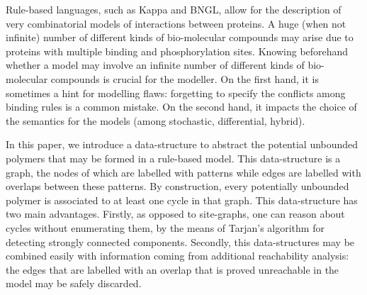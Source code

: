 Rule-based languages, such as Kappa and BNGL, allow for the description of very combinatorial models of interactions between proteins. A huge (when not infinite) number of different kinds of bio-molecular compounds may arise
 due to proteins with multiple binding and phosphorylation sites. Knowing beforehand whether a model may involve an infinite number of different kinds of bio-molecular compounds is crucial for the modeller. On the first hand, it is sometimes a hint for modelling flaws: forgetting to specify
the conflicts among binding rules is a common mistake. On the second hand,
it impacts the choice of  the semantics for the models (among stochastic, differential, hybrid).

In this paper, we introduce a data-structure to abstract the potential unbounded polymers that may be formed in a rule-based model. This data-structure is a graph, the nodes of which are labelled with patterns while edges are labelled with overlaps between these patterns. By construction,  every potentially unbounded polymer is associated to at least one cycle in that graph. This data-structure has two main advantages. Firstly, as opposed to site-graphs, one can reason about cycles without enumerating them, by the means of Tarjan's algorithm for detecting strongly connected components. Secondly, this data-structures may be combined easily with information coming from additional reachability analysis: the edges that are labelled with an overlap that is proved unreachable in the model may be safely discarded.
